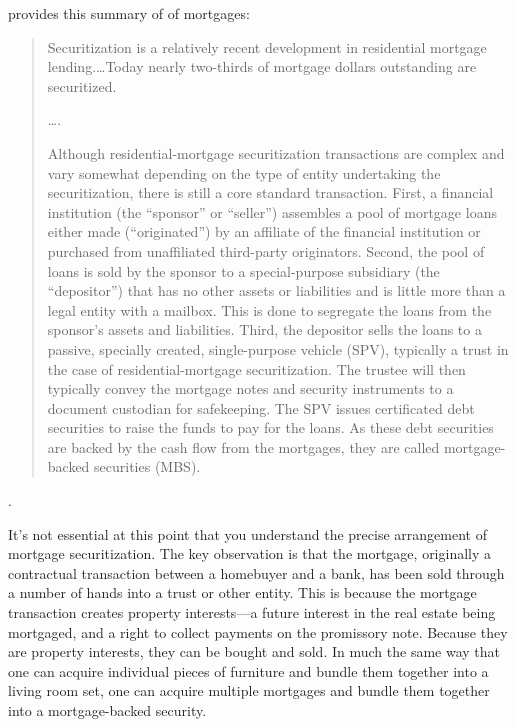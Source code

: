 
 provides this summary of
 of mortgages:
\begin{quotation}
Securitization is a relatively recent development in residential mortgage
lending.\ldots Today nearly two-thirds of mortgage dollars
outstanding are securitized.

\ldots.

Although residential-mortgage securitization transactions are complex and vary
somewhat depending on the type of entity undertaking the securitization, there
is still a  core standard  transaction. First, a financial  institution  (the
``sponsor''  or ``seller'') assembles a pool of mortgage loans either made
(``originated'')  by  an affiliate of the financial institution or
purchased from unaffiliated third-party originators. Second, the pool of
loans is sold by the sponsor to a special-purpose subsidiary (the
``depositor'') that has no other assets or liabilities and is little more than
a legal entity with a mailbox. This is done to segregate the loans from the
sponsor's assets and liabilities. Third, the depositor sells the loans to a
passive, specially created, single-purpose vehicle (SPV), typically a trust in
the case of residential-mortgage securitization. The trustee will then
typically convey the mortgage notes and security instruments to a document
custodian for safekeeping. The SPV issues certificated debt securities to raise
the funds to pay for the loans. As these debt securities are backed by the cash
flow from the mortgages, they are called mortgage-backed securities (MBS).
\end{quotation}
.

It's not essential at this point that you understand the precise arrangement of
mortgage securitization. The key observation is that the mortgage, originally a
contractual transaction between a homebuyer and a bank, has been sold through a
number of hands into a trust or other entity. This is because the mortgage
transaction creates property interests---a future interest in the real estate
being mortgaged, and a right to collect payments on the promissory note. Because
they are property interests, they can be bought and sold. In much the same way
that one can acquire individual pieces of furniture and bundle them together
into a living room set, one can acquire multiple mortgages and bundle them
together into a mortgage-backed security.

